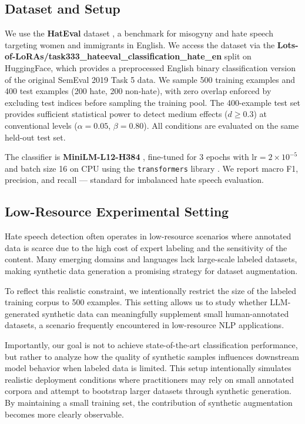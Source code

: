 \documentclass[11pt]{article}
\begin{document}
\subsection{Dataset and Setup}
We use the \textbf{HatEval} dataset \cite{basile-etal-2019-semeval},
a benchmark for misogyny and hate speech targeting women and immigrants in English.
We access the dataset via the \textbf{Lots-of-LoRAs/task333\_hateeval\_classification\_hate\_en}
split on HuggingFace, which provides a preprocessed English binary classification
version of the original SemEval 2019 Task 5 data.
We sample 500 training examples and 400 test examples (200 hate, 200 non-hate),
with zero overlap enforced by excluding test indices before sampling the training pool.
The 400-example test set provides sufficient statistical power to detect medium effects
($d \geq 0.3$) at conventional levels ($\alpha = 0.05$, $\beta = 0.80$).
All conditions are evaluated on the same held-out test set.

The classifier is \textbf{MiniLM-L12-H384} \cite{wang-etal-2020-minilm}, fine-tuned for 3 epochs with $\mathrm{lr}=2\times10^{-5}$ and batch size 16 on CPU using the \texttt{transformers} library \cite{wolf-etal-2020-transformers}.
We report macro F1, precision, and recall — standard for imbalanced hate speech evaluation.

\subsection{Low-Resource Experimental Setting}

Hate speech detection often operates in low-resource scenarios where annotated data is scarce due to the high cost of expert labeling and the sensitivity of the content. Many emerging domains and languages lack large-scale labeled datasets, making synthetic data generation a promising strategy for dataset augmentation.

To reflect this realistic constraint, we intentionally restrict the size of the labeled training corpus to 500 examples. This setting allows us to study whether LLM-generated synthetic data can meaningfully supplement small human-annotated datasets, a scenario frequently encountered in low-resource NLP applications.

Importantly, our goal is not to achieve state-of-the-art classification performance, but rather to analyze how the quality of synthetic samples influences downstream model behavior when labeled data is limited. This setup intentionally simulates realistic deployment conditions where practitioners may rely on small annotated corpora and attempt to bootstrap larger datasets through synthetic generation. By maintaining a small training set, the contribution of synthetic augmentation becomes more clearly observable.
\end{document}

